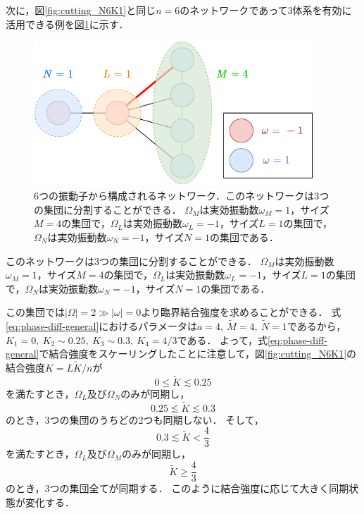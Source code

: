 \documentclass[../main]{subfiles}
\begin{document}
次に，図\ref{fig:cutting_N6K1}と同じ$n=6$のネットワークであって3体系を有効に活用できる例を図\ref{fig:3body-application}に示す．

\begin{figure}[tbp]
    \centering
    \includegraphics[width=105mm]{images/three-body-application.pdf}
    \centering
    \caption{6つの振動子から構成されるネットワーク．このネットワークは3つの集団に分割することができる．
    $\Omega_M$は実効振動数$\omega_M=1$，サイズ$M=4$の集団で，$\Omega_L$は実効振動数$\omega_L=-1$，サイズ$L=1$の集団で，$\Omega_N$は実効振動数$\omega_N=-1$，サイズ$N=1$の集団である．}
    \label{fig:3body-application}
\end{figure}

このネットワークは3つの集団に分割することができる．
$\Omega_M$は実効振動数$\omega_M=1$，サイズ$M=4$の集団で，$\Omega_L$は実効振動数$\omega_L=-1$，サイズ$L=1$の集団で，$\Omega_N$は実効振動数$\omega_N=-1$，サイズ$N=1$の集団である．

この集団では$|\Omega|=2\gg|\omega|=0$より臨界結合強度を求めることができる．
式\eqref{eq:phase-diff-general}におけるパラメータは$a=4,\ \tilde{M}=4,\ \tilde{N}=1$であるから，
$K_1=0,\ K_2\sim 0.25,\ K_3\sim 0.3,\ K_4=4/3$である．
よって，式\eqref{eq:phase-diff-general}で結合強度をスケーリングしたことに注意して，図\ref{fig:cutting_N6K1}の結合強度$K=L\tilde{K}/n$が
\begin{equation*}
    0\leq \tilde{K}\lesssim 0.25
\end{equation*}
を満たすとき，$\Omega_L$及び$\Omega_N$のみが同期し，
\begin{equation*}
    0.25\lesssim \tilde{K}\lesssim 0.3
\end{equation*}
のとき，3つの集団のうちどの2つも同期しない．
そして，
\begin{equation*}
    0.3\lesssim \tilde{K}<\frac{4}{3}
\end{equation*}
を満たすとき，$\Omega_L$及び$\Omega_M$のみが同期し，
\begin{equation*}
    \tilde{K}\geq \frac{4}{3}
\end{equation*}
のとき，3つの集団全てが同期する．
このように結合強度に応じて大きく同期状態が変化する．
\end{document}
